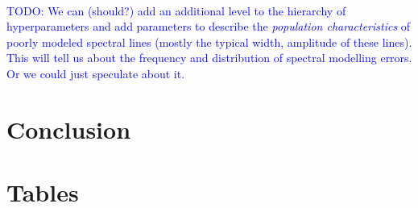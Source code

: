 \documentclass[iop,floatfix]{emulateapj}
\newcommand{\todo}[1]{ \textcolor{blue}{\\TODO: #1}}
\begin{document}
\todo{We can (should?) add an additional level to the hierarchy of hyperparameters and add parameters to describe the \emph{population characteristics} of poorly modeled spectral lines (mostly the typical width, amplitude of these lines).  This will tell us about the frequency and distribution of spectral modelling errors. Or we could just speculate about it.}


\section{Conclusion}
\label{sec:conclusion}




\section{Tables}
\end{document}
